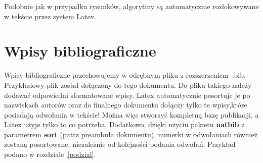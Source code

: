 \documentclass[twoside,a4paper]{book}
\begin{document}
Podobnie jak w przypadku rysunków, algorytmy są automatycznie rozlokowywane w tekście przez system Latex.


\section{Wpisy bibliograficzne}

Wpisy bibliograficzne przechowujemy w odrębnym pliku z rozszerzeniem\ .bib. Przykładowy plik został dołączony do tego dokumentu. Do pliku takiego należy dodawać odpowiedni sformatowane wpisy. Latex automatycznie posortuje je po nazwiskach autorów oraz do finalnego dokumentu dołączy tylko te wpisy,które posiadają odwołania w tekście! Można więc stworzyć kompletną bazę publikacji, a Latex użyje tylko to co potrzeba. Dodatkowo, dzięki użyciu pakietu \textbf{natbib} z parametrem \textbf{sort} (patrz preambuła dokumentu), numerki w odwołaniach również zostaną posortowane, niezależnie od kolejności podania odwołań. Przykład podano w rozdziale~\ref{podzial}.


\backmatter

\listoffigures
\listoftables
\listofalgorithms



\end{document}
